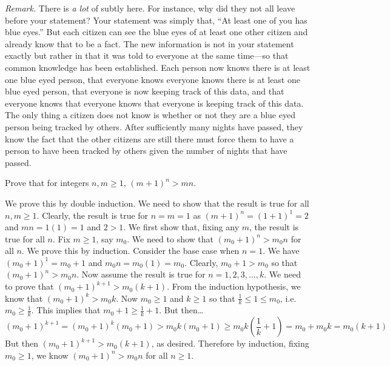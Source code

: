 \documentclass[11pt,letterpaper]{article}
\begin{document}
\vfill

{\itshape Remark.} There is \textit{a lot} of subtly here. For instance, why did they not all leave before your statement? Your statement was simply that, ``At least one of you has blue eyes.'' But each citizen can see the blue eyes of at least one other citizen and already know that to be a fact. The new information is not in your statement exactly but rather in that it was told to everyone at the same time---so that common knowledge has been established. Each person now knows there is at least one blue eyed person, that everyone knows everyone knows there is at least one blue eyed person, that everyone is now keeping track of this data, and that everyone knows that everyone knows that everyone is keeping track of this data. The only thing a citizen does not know is whether or not they are a blue eyed person being tracked by others. After sufficiently many nights have passed, they know the fact that the other citizens are still there must force them to have a person to have been tracked by others given the number of nights that have passed. 



\newpage



 Prove that for integers $n, m \geq 1$, $(m + 1)^n > mn$. \pspace

\sol We prove this by double induction. We need to show that the result is true for all $n, m \geq 1$. Clearly, the result is true for $n= m= 1$ as $(m + 1)^n= (1 + 1)^1= 2$ and $mn= 1(1)= 1$ and $2 > 1$. We first show that, fixing any $m$, the result is true for all $n$. Fix $m \geq 1$, say $m_0$. We need to show that $(m_0 + 1)^n > m_0 n$ for all $n$. We prove this by induction. Consider the base case when $n= 1$. We have $(m_0 + 1)^1= m_0 + 1$ and $m_0n= m_0(1)= m_0$. Clearly, $m_0 + 1 > m_0$ so that $(m_0 + 1)^n > m_0n$. Now assume the result is true for $n= 1, 2, 3, \ldots, k$. We need to prove that $(m_0 + 1)^{k+1} > m_0(k + 1)$. From the induction hypothesis, we know that $(m_0 + 1)^k > m_0k$. Now $m_0 \geq 1$ and $k \geq 1$ so that $\frac{1}{k} \leq 1 \leq m_0$, i.e. $m_0 \geq \frac{1}{k}$. This implies that $m_0 + 1 \geq \frac{1}{k} + 1$. But then\dots
	\[
	(m_0 + 1)^{k+1}= (m_0 + 1)^k (m_0 + 1) > m_0k (m_0 + 1) \geq m_0k \left( \frac{1}{k} + 1 \right)= m_0 + m_0k= m_0(k+1)
	\]
But then $(m_0 + 1)^{k+1} > m_0(k+1)$, as desired. Therefore by induction, fixing $m_0 \geq 1$, we know $(m_0 + 1)^n > m_0n$ for all $n \geq 1$. \pspace
\end{document}
